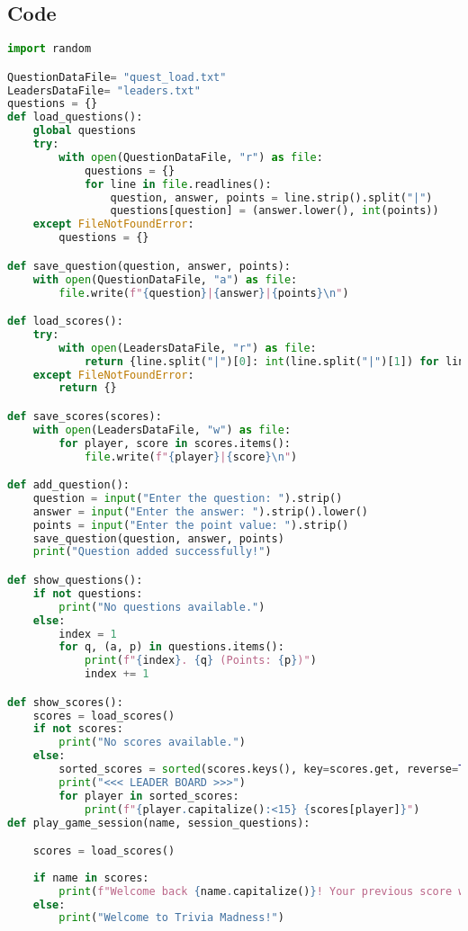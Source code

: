 \documentclass{article}
\begin{document}
\subsection{Code}

\begin{lstlisting}[language=Python]
import random

QuestionDataFile= "quest_load.txt"
LeadersDataFile= "leaders.txt"
questions = {}
def load_questions():
    global questions
    try:
        with open(QuestionDataFile, "r") as file:
            questions = {}
            for line in file.readlines():
                question, answer, points = line.strip().split("|")
                questions[question] = (answer.lower(), int(points))
    except FileNotFoundError:
        questions = {}

def save_question(question, answer, points):
    with open(QuestionDataFile, "a") as file:
        file.write(f"{question}|{answer}|{points}\n")

def load_scores():
    try:
        with open(LeadersDataFile, "r") as file:
            return {line.split("|")[0]: int(line.split("|")[1]) for line in file.readlines()}
    except FileNotFoundError:
        return {}

def save_scores(scores):
    with open(LeadersDataFile, "w") as file:
        for player, score in scores.items():
            file.write(f"{player}|{score}\n")

def add_question():
    question = input("Enter the question: ").strip()
    answer = input("Enter the answer: ").strip().lower()
    points = input("Enter the point value: ").strip()
    save_question(question, answer, points)
    print("Question added successfully!")

def show_questions():
    if not questions:
        print("No questions available.")
    else:
        index = 1
        for q, (a, p) in questions.items():
            print(f"{index}. {q} (Points: {p})")
            index += 1

def show_scores():
    scores = load_scores()
    if not scores:
        print("No scores available.")
    else:
        sorted_scores = sorted(scores.keys(), key=scores.get, reverse=True)
        print("<<< LEADER BOARD >>>")
        for player in sorted_scores:
            print(f"{player.capitalize():<15} {scores[player]}")
def play_game_session(name, session_questions):

    scores = load_scores()
    
    if name in scores:
        print(f"Welcome back {name.capitalize()}! Your previous score was {scores[name]}")
    else:
        print("Welcome to Trivia Madness!")
    

\end{lstlisting}
\end{document}

